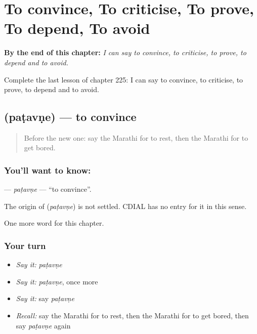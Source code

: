 
\chapter{To convince, To criticise, To prove, To depend, To avoid}
\label{ch:mr-to-convince-to-criticise-to-prove-to-depend-to-avoid}

\begin{chapteropening}
\textbf{By the end of this chapter:} \emph{I can say to convince, to criticise, to prove, to depend and to avoid.}

Complete the last lesson of chapter 225: I can say to convince, to criticise, to prove, to depend and to avoid.
\end{chapteropening}

\section[\texorpdfstring{\mr{पटवणे} (paṭavṇe)}{पटवणे (paṭavṇe)}]{ (paṭavṇe) — to convince}

\label{lesson:MR-C225-patavne}



\begin{quote}
Before the new one: say the Marathi for to rest, then the Marathi for to get bored.
\end{quote}

\subsection*{You'll want to know: }
\textbf{} — \emph{paṭavṇe} — \textquotedblleft{}to convince\textquotedblright{}.

\begin{cousinweb}
The origin of \textbf{} (\emph{paṭavṇe}) is not settled. CDIAL has no entry for it in this sense.
\end{cousinweb}

\begin{grammarlens}[title={What you've built}]
One more word for this chapter.
\end{grammarlens}

\subsection*{Your turn}
\begin{itemize}
\raggedright
  \item \emph{Say it:} \emph{paṭavṇe}
  \item \emph{Say it:} \emph{paṭavṇe}, once more
  \item \emph{Say it:} say \emph{paṭavṇe}
  \item \emph{Recall:} say the Marathi for to rest, then the Marathi for to get bored, then say \emph{paṭavṇe} again
\end{itemize}

